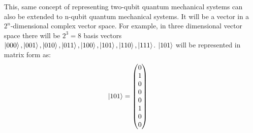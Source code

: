 This, same concept of representing two-qubit quantum mechanical systems can also be extended to n-qubit quantum mechanical systems. It will be a vector in a $2^n$-dimensional complex vector space.
For example, in three dimensional vector space there will be $2^3=8$ basis vectors $\ket{000},\ket{001},\ket{010},\ket{011},\ket{100},\ket{101},\ket{110},\ket{111}$.
$\ket{101}$ will be represented in matrix form as:
\[
    \ket{101}=\begin{pmatrix} 0 \\ 1 \\ 0 \\ 0 \\ 0 \\ 1 \\ 0 \\ 0 \end{pmatrix}
\]


